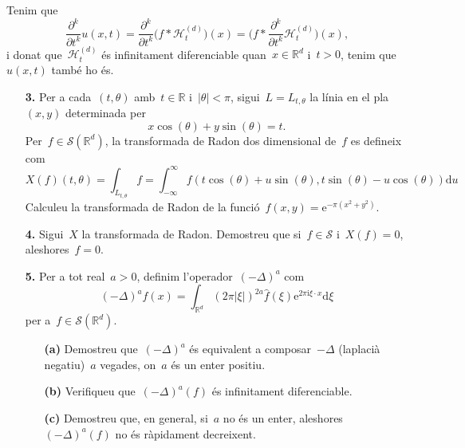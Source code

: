 \documentclass[a4paper]{article}
\theoremstyle{plain}
\theoremstyle{definition}
\newcommand{\iu}{\mathrm{i}}
\newcommand{\e}{\mathrm{e}}
\providecommand{\uppi}{\pi}
\newcommand{\diff}{\mathrm{d}}
\newcommand{\abs}[1]{\lvert{#1}\rvert}
\newcommand{\Sc}{\mathcal{S}}
\newcommand{\Hk}{\mathcal{H}}
\newcommand{\mlap}{-\Delta}
\newcommand{\RR}{\mathbb{R}}
\begin{document}
Tenim que
\[
    \frac{\partial^{k}}{\partial t^{k}}u(x,t)
    =
    \frac{\partial^{k}}{\partial t^{k}}
    \bigl(f\ast\Hk_{t}^{(d)}\bigr)(x)
    =
    \biggl(
        f\ast\frac{\partial^{k}}{\partial t^{k}}
        \Hk_{t}^{(d)}
    \biggr)(x),
\]
i donat que~\(\Hk_{t}^{(d)}\) és infinitament diferenciable quan~\(x\in\RR^{d}\)
i~\(t>0\), tenim que~\(u(x,t)\) també ho és.

\begin{enumerate}
    \item[\textbf{3.}] Per a cada~\((t,\theta)\) amb~\(t\in\RR\)
        i~\(\abs{\theta}<\uppi\), sigui~\(L=L_{t,\theta}\) la línia en el
        pla~\((x,y)\) determinada per
        \[
            x\cos(\theta) + y\sin(\theta) = t.
        \]
        Per~\(f\in\Sc(\RR^{d})\), la transformada de Radon dos dimensional
        de~\(f\) es defineix com
        \[
            X(f)(t,\theta)
            =
            \int_{L_{t,\theta}}f
            =
            \int_{-\infty}^{\infty}
            f(t\cos(\theta) + u\sin(\theta), t\sin(\theta) - u\cos(\theta))
            \diff u
        \]
        Calculeu la transformada de Radon de la
        funció~\(f(x,y)=\e^{-\uppi(x^{2}+y^{2})}\).
\end{enumerate}

\begin{enumerate}
    \item[\textbf{4.}] Sigui~\(X\) la transformada de Radon. Demostreu que
        si~\(f\in\Sc\) i~\(X(f)=0\), aleshores~\(f=0\).
\end{enumerate}

\begin{enumerate}
    \item[\textbf{5.}] Per a tot real~\(a>0\), definim
        l'operador~\((\mlap)^{a}\) com
        \[
            (\mlap)^{a}f(x)
            =
            \int_{\RR^{d}}
            (2\uppi\abs{\xi})^{2a}
            \widehat{f}(\xi)
            \e^{2\uppi\iu\xi\cdot x}
            \diff\xi
        \]
        per a~\(f\in\Sc(\RR^{d})\).
        \begin{enumerate}
            \item[\textbf{(a)}] Demostreu que~\((\mlap)^{a}\) és equivalent a
                composar~\(\mlap\) (laplacià negatiu)~\(a\) vegades, on~\(a\)
                és un enter positiu.
        \end{enumerate}
\end{enumerate}

\begin{enumerate}
    \item[]\begin{enumerate}
        \item[\textbf{(b)}] Verifiqueu que~\((\mlap)^{a}(f)\) és infinitament
            diferenciable.
    \end{enumerate}
\end{enumerate}

\begin{enumerate}
    \item[]\begin{enumerate}
        \item[\textbf{(c)}] Demostreu que, en general, si~\(a\) no és un enter,
            aleshores~\((\mlap)^{a}(f)\) no és ràpidament decreixent.
    \end{enumerate}
\end{enumerate}
\end{document}

